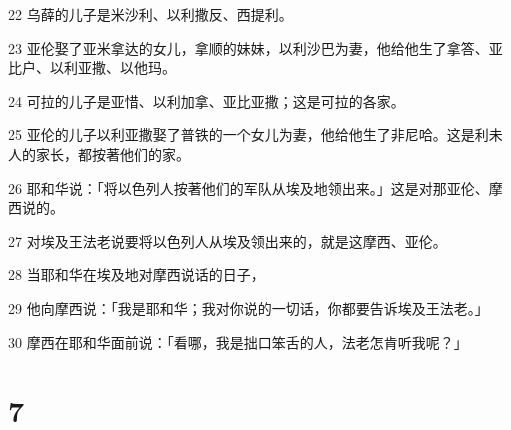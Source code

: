 \par 22 乌薛的儿子是米沙利、以利撒反、西提利。
\par 23 亚伦娶了亚米拿达的女儿，拿顺的妹妹，以利沙巴为妻，他给他生了拿答、亚比户、以利亚撒、以他玛。
\par 24 可拉的儿子是亚惜、以利加拿、亚比亚撒；这是可拉的各家。
\par 25 亚伦的儿子以利亚撒娶了普铁的一个女儿为妻，他给他生了非尼哈。这是利未人的家长，都按著他们的家。
\par 26 耶和华说：「将以色列人按著他们的军队从埃及地领出来。」这是对那亚伦、摩西说的。
\par 27 对埃及王法老说要将以色列人从埃及领出来的，就是这摩西、亚伦。
\par 28 当耶和华在埃及地对摩西说话的日子，
\par 29 他向摩西说：「我是耶和华；我对你说的一切话，你都要告诉埃及王法老。」
\par 30 摩西在耶和华面前说：「看哪，我是拙口笨舌的人，法老怎肯听我呢？」

\chapter{7}

